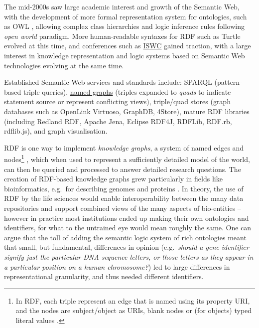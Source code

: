 \documentclass[fleqn,10pt,lineno]{wlpeerjlua}
\begin{document}
The mid-2000s saw large academic interest and growth of the Semantic Web, with the development of more formal representation system for ontologies, such as OWL \autocite{w3-owl2-overview}, allowing complex class hierarchies and logic inference rules following \emph{open world} paradigm.
More human-readable syntaxes for RDF such as Turtle evolved at this time, and conferences such as \href{https://iswc2022.semanticweb.org/}{ISWC} \autocite{horrocksSemanticWebISWC2002} gained traction, with a large interest in knowledge representation and logic systems based on Semantic Web technologies evolving at the same time.

Established Semantic Web services and standards include: SPARQL \autocite{w3-sparql11-overview} (pattern-based triple queries), \href{https://www.w3.org/TR/rdf11-concepts/\#section-dataset}{named graphs} \autocite{w3-rdf11-concepts} (triples expanded to \emph{quads} to indicate statement source or represent conflicting views), triple/quad stores (graph databases such as OpenLink Virtuoso, GraphDB, 4Store), mature RDF libraries (including Redland RDF, Apache Jena, Eclipse RDF4J, RDFLib, RDF.rb, rdflib.js), and  graph visualisation.

RDF is one way to implement \emph{knowledge graphs}, a system of named edges and nodes\footnote{In RDF, each triple represent an edge that is named using its property URI, and the nodes are subject/object as URIs, blank nodes or (for objects) typed literal values \autocite{w3-rdf11-primer}.} \autocite{nurdiati2008}, which when used to represent a sufficiently detailed model of the world, can then be queried and processed to answer detailed research questions. The creation of RDF-based knowledge graphs grew particularly in fields like bioinformatics, e.g.~for describing genomes and proteins \autocite{gobleStateNationData2008c,williamsOpenPHACTSSemantic2012c}. In theory, the use of RDF by the life sciences would enable interoperability between the many data repositories and support combined views of the many aspects of bio-entities -- however in practice most institutions ended up making their own ontologies and identifiers, for what to the untrained eye would mean roughly the same. One can argue that the toll of adding the semantic logic system of rich ontologies meant that small, but fundamental, differences in opinion (e.g.~\emph{should a gene identifier signify just the particular DNA sequence letters, or those letters as they appear in a particular position on a human chromosome?}) led to large differences in representational granularity, and thus needed different identifiers.
\end{document}
